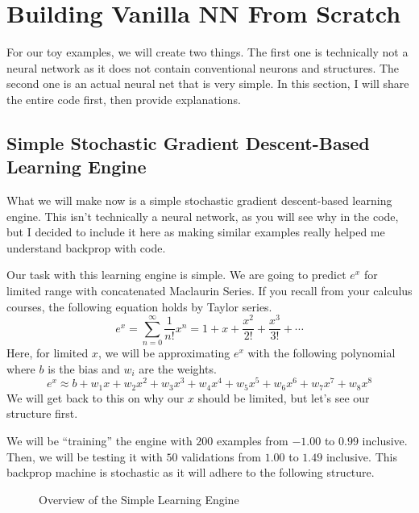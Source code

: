 \documentclass[../../../main.tex]{subfiles}
\begin{document}
\section{Building Vanilla NN From Scratch}

For our toy examples, we will create two things. The first one is
technically not a neural network as it does not contain conventional
neurons and structures. The second one is an actual neural net that
is very simple. In this section, I will share the entire code first,
then provide explanations.

\subsection{Simple Stochastic Gradient Descent-Based
\texorpdfstring{\\}{ }Learning Engine}

What we will make now is a simple stochastic gradient descent-based
learning engine. This isn't technically a neural network, as you will
see why in the code, but I decided to include it here as making
similar examples really helped me understand backprop with code.

Our task with this learning engine is simple. We are going to predict
$e^x$ for limited range with concatenated Maclaurin Series.
If you recall from your calculus courses, the following equation holds
by Taylor series.
\[
e^x
= \sum_{n = 0}^\infty \frac{1}{n!} x^n
= 1 + x + \frac{x^2}{2!} + \frac{x^3}{3!} + \cdots
\]
Here, for limited $x$, we will be approximating $e^x$ with the
following polynomial where $b$ is the bias and $w_i$ are the
weights.
\[
e^x
\approx b + w_1x + w_2x^2 + w_3x^3 + w_4x^4 + w_5x^5 + w_6x^6
    + w_7x^7 + w_8x^8
\]
We will get back to this on why our $x$ should be limited, but let's
see our structure first.

We will be ``training'' the engine with $200$ examples from $-1.00$ to
$0.99$ inclusive. Then, we will be testing it with $50$ validations
from $1.00$ to $1.49$ inclusive. This backprop machine is stochastic
as it will adhere to the following structure.

\begin{figure}[H]
\centering
{}
\caption{Overview of the Simple Learning Engine}
\end{figure}
\end{document}
